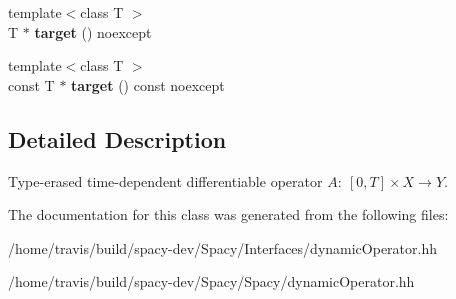 \begin{DoxyCompactItemize}
\item 
\hypertarget{classSpacy_1_1DynamicC1Operator_a2a1bdf1b5ccc6876ab2698d60318a5a6}{{\footnotesize template$<$class T $>$ }\\\-T $\ast$ {\bfseries target} () noexcept}\label{classSpacy_1_1DynamicC1Operator_a2a1bdf1b5ccc6876ab2698d60318a5a6}

\item 
\hypertarget{classSpacy_1_1DynamicC1Operator_ae1685f9300539256df1fece193c7fa7b}{{\footnotesize template$<$class T $>$ }\\const \-T $\ast$ {\bfseries target} () const noexcept}\label{classSpacy_1_1DynamicC1Operator_ae1685f9300539256df1fece193c7fa7b}

\end{DoxyCompactItemize}


\subsection{\-Detailed \-Description}
\-Type-\/erased time-\/dependent differentiable operator $A:\ [0,T] \times X \to Y $. 

\-The documentation for this class was generated from the following files\-:\begin{DoxyCompactItemize}
\item 
/home/travis/build/spacy-\/dev/\-Spacy/\-Interfaces/dynamic\-Operator.\-hh\item 
/home/travis/build/spacy-\/dev/\-Spacy/\-Spacy/dynamic\-Operator.\-hh\end{DoxyCompactItemize}
